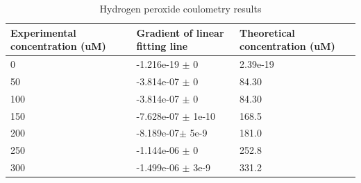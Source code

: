 \begin{table}[H]
    \centering
    \begin{tabularx}{.45\textwidth}{|p{}|p{}|p{}|}\hline
        Experimental concentration (uM) & Gradient of linear fitting line & Theoretical concentration (uM)  \\ \hline
        0   & -1.216e-19 $\pm$ 0 & 2.39e-19\\ \hline
        50  & -3.814e-07 $\pm$ 0 & 84.30\\ \hline
        100 & -3.814e-07 $\pm$ 0 & 84.30\\ \hline
        150 & -7.628e-07 $\pm$ 1e-10 & 168.5\\ \hline
        200 &  -8.189e-07$\pm$ 5e-9 & 181.0\\ \hline
        250 & -1.144e-06 $\pm$ 0 & 252.8\\ \hline
        300 & -1.499e-06 $\pm$ 3e-9 & 331.2\\ \hline
    \end{tabularx}
    \caption{Hydrogen peroxide coulometry results}
    \label{tab:h2o2_col_res}
\end{table}

